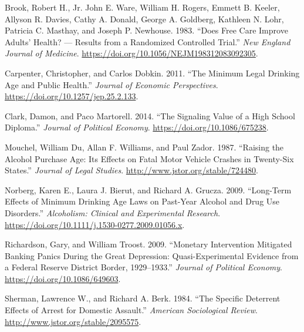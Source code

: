 \documentclass[]{book}
\theoremstyle{definition}
\theoremstyle{definition}
\theoremstyle{definition}
\theoremstyle{remark}
\begin{document}
\leavevmode\hypertarget{ref-BrookWareEtAl1983}{}%
Brook, Robert H., Jr. John E. Ware, William H. Rogers, Emmett B. Keeler,
Allyson R. Davies, Cathy A. Donald, George A. Goldberg, Kathleen N.
Lohr, Patricia C. Masthay, and Joseph P. Newhouse. 1983. ``Does Free
Care Improve Adults' Health? --- Results from a Randomized Controlled
Trial.'' \emph{New England Journal of Medicine}.
\url{https://doi.org/10.1056/NEJM198312083092305}.

\leavevmode\hypertarget{ref-CarpenterDobkin2009}{}%
Carpenter, Christopher, and Carlos Dobkin. 2011. ``The Minimum Legal
Drinking Age and Public Health.'' \emph{Journal of Economic
Perspectives}. \url{https://doi.org/10.1257/jep.25.2.133}.

\leavevmode\hypertarget{ref-ClarkMartorell2014}{}%
Clark, Damon, and Paco Martorell. 2014. ``The Signaling Value of a High
School Diploma.'' \emph{Journal of Political Economy}.
\url{https://doi.org/10.1086/675238}.

\leavevmode\hypertarget{ref-DuMouchelWilliamsZador1987}{}%
Mouchel, William Du, Allan F. Williams, and Paul Zador. 1987. ``Raising
the Alcohol Purchase Age: Its Effects on Fatal Motor Vehicle Crashes in
Twenty-Six States.'' \emph{Journal of Legal Studies}.
\url{http://www.jstor.org/stable/724480}.

\leavevmode\hypertarget{ref-NorbergBierutGrucza2009}{}%
Norberg, Karen E., Laura J. Bierut, and Richard A. Grucza. 2009.
``Long-Term Effects of Minimum Drinking Age Laws on Past-Year Alcohol
and Drug Use Disorders.'' \emph{Alcoholism: Clinical and Experimental
Research}. \url{https://doi.org/10.1111/j.1530-0277.2009.01056.x}.

\leavevmode\hypertarget{ref-RichardsonTroost2009}{}%
Richardson, Gary, and William Troost. 2009. ``Monetary Intervention
Mitigated Banking Panics During the Great Depression: Quasi-Experimental
Evidence from a Federal Reserve District Border, 1929--1933.''
\emph{Journal of Political Economy}.
\url{https://doi.org/10.1086/649603}.

\leavevmode\hypertarget{ref-ShermanBerk1984}{}%
Sherman, Lawrence W., and Richard A. Berk. 1984. ``The Specific
Deterrent Effects of Arrest for Domestic Assault.'' \emph{American
Sociological Review}. \url{http://www.jstor.org/stable/2095575}.
\end{document}
